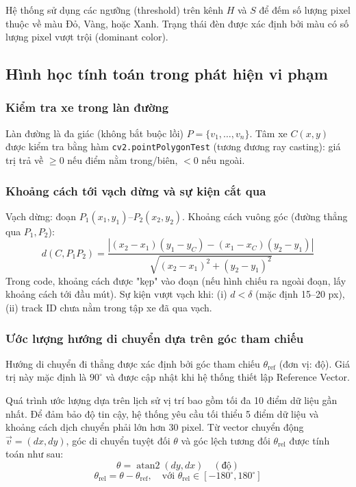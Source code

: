 Hệ thống sử dụng các ngưỡng (threshold) trên kênh $H$ và $S$ để đếm số lượng pixel thuộc về màu Đỏ, Vàng, hoặc Xanh. Trạng thái đèn được xác định bởi màu có số lượng pixel vượt trội (dominant color).

\subsection{Hình học tính toán trong phát hiện vi phạm}

\subsubsection{Kiểm tra xe trong làn đường}
Làn đường là đa giác (không bắt buộc lồi) \(P = \{v_1,\dots,v_n\}\). Tâm xe \(C(x,y)\) được kiểm tra bằng hàm \texttt{cv2.pointPolygonTest} (tương đương ray casting): giá trị trả về \(\ge 0\) nếu điểm nằm trong/biên, \(<0\) nếu ngoài.

\subsubsection{Khoảng cách tới vạch dừng và sự kiện cắt qua}
Vạch dừng: đoạn \(P_1(x_1,y_1)\)--\(P_2(x_2,y_2)\). Khoảng cách vuông góc (đường thẳng qua \(P_1,P_2\)):
\[
d(C, P_1P_2) = \frac{|(x_2 - x_1)(y_1 - y_C) - (x_1 - x_C)(y_2 - y_1)|}{\sqrt{(x_2 - x_1)^2 + (y_2 - y_1)^2}}
\]
Trong code, khoảng cách được "kẹp" vào đoạn (nếu hình chiếu ra ngoài đoạn, lấy khoảng cách tới đầu mút).
Sự kiện vượt vạch khi: (i) \(d < \delta\) (mặc định 15--20 px), (ii) track ID chưa nằm trong tập xe đã qua vạch.

\subsubsection{Ước lượng hướng di chuyển dựa trên góc tham chiếu}
Hướng di chuyển đi thẳng được xác định bởi góc tham chiếu $\theta_{\text{ref}}$ (đơn vị: độ). Giá trị này mặc định là $90^\circ$ và được cập nhật khi hệ thống thiết lập Reference Vector.

Quá trình ước lượng dựa trên lịch sử vị trí bao gồm tối đa 10 điểm dữ liệu gần nhất. Để đảm bảo độ tin cậy, hệ thống yêu cầu tối thiểu 5 điểm dữ liệu và khoảng cách dịch chuyển phải lớn hơn 30 pixel. Từ vector chuyển động $\vec{v}=(dx, dy)$, góc di chuyển tuyệt đối $\theta$ và góc lệch tương đối $\theta_{\text{rel}}$ được tính toán như sau:
\[
    \theta = \operatorname{atan2}(dy, dx) \quad (\text{độ})
\]
\[
    \theta_{\text{rel}} = \theta - \theta_{\text{ref}}, \quad \text{với } \theta_{\text{rel}} \in [-180^\circ, 180^\circ]
\]

